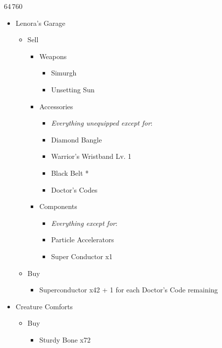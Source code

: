 \begin{shop}{64\,760}
\begin{multicols}{2}
\begin{itemize}
    \item Lenora's Garage
    \begin{itemize}
        \item Sell
        \begin{itemize}
            \item Weapons
            \begin{itemize}
                \item Simurgh
                \item Unsetting Sun
            \end{itemize}
            \item Accessories
            \begin{itemize}
                \item \textit{Everything unequipped except for}:
                \item Diamond Bangle
                \item Warrior's Wristband Lv. 1
                \item Black Belt *
                \item Doctor's Codes
            \end{itemize}
            \item Components
            \begin{itemize}
                \item \textit{Everything except for}:
                \item Particle Accelerators
                \item Super Conductor x1
            \end{itemize}
        \end{itemize}
        \item Buy
        \begin{itemize}
            \item Superconductor x42 + 1 for each Doctor's Code remaining
        \end{itemize}
    \end{itemize}
    \columnbreak
    \item Creature Comforts
    \begin{itemize}
        \item Buy
        \begin{itemize}
            \item Sturdy Bone x72

\end{itemize}
\end{itemize}
\end{itemize}
\end{multicols}
\end{shop}
